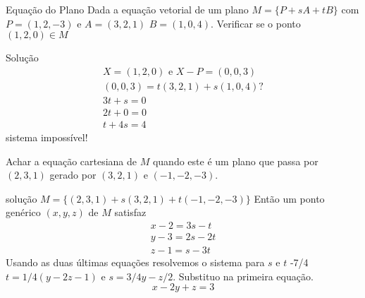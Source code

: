 \documentclass{beamer}
\begin{document}
    \begin{frame}{Equação do Plano}
      Dada a equação vetorial de um plano $M =\{P+sA+tB\}$
      com $P=(1,2,-3)$ e $A=(3,2,1)$ $B=(1,0,4)$.
      Verificar se o ponto $(1,2,0)\in M$
      
    \end{frame}
    \begin{frame}{Solução}
      \begin{gather*}
        X=(1,2,0) \text{ e }X-P=(0,0,3) \\
        (0,0,3)= t(3,2,1) + s(1,0,4) ? \\
        3t + s =0 \\
        2t + 0 =0 \\
        t + 4s =4
      \end{gather*}
      sistema impossível!

       \end{frame}
\begin{frame}
  Achar a equação cartesiana de $M$ quando este é um plano  
  que passa por $(2,3,1)$ gerado por $(3,2,1)$ e $(-1,-2,-3)$.

\end{frame}
\begin{frame}{solução} 
  $M=\{ (2,3,1)+s(3,2,1)+t(-1,-2,-3)\}$ Então um ponto genérico
   $(x,y,z)$ de $M$ satisfaz
  \begin{gather*}
    x-2 = 3s-t \\
    y-3 = 2s -2t \\
    z-1 = s-3t
  \end{gather*}
  Usando as duas últimas equações resolvemos o sistema 
  para $s$ e $t$ -7/4
  $t=1/4(y-2z-1)$ e $s=3/4y -z/2.$ Substituo na primeira equação.
  $$x-2y+z=3$$

\end{frame}
\end{document}
